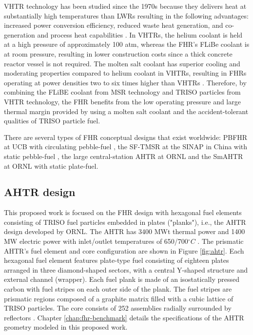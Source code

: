 \gls{VHTR} technology has been studied since the 1970s because they delivers 
heat at substantially high temperatures than \glspl{LWR} resulting in 
the following advantages: increased power conversion efficiency, reduced 
waste heat generation, and co-generation and process heat capabilities 
\cite{scarlat_design_2014}. 
In \glspl{VHTR}, the helium coolant is held at a high pressure of approximately 
100 atm, whereas the \gls{FHR}'s FLiBe coolant is at room pressure, resulting in lower 
construction costs since a thick concrete reactor vessel is not required.
The molten salt coolant has superior cooling and moderating properties compared 
to helium coolant in \glspl{VHTR}, resulting in \glspl{FHR} operating at 
power densities two to six times higher than  \glspl{VHTR} 
\cite{scarlat_design_2014,forsberg_fluoride-salt-cooled_2012}.
Therefore, by combining the FLiBE coolant from \gls{MSR} technology and 
\gls{TRISO} particles from \gls{VHTR} technology, the \gls{FHR} benefits from 
the low operating pressure and large thermal margin provided by using a molten 
salt coolant and the accident-tolerant qualities of \gls{TRISO} particle fuel. 

There are several types of \gls{FHR} conceptual designs that exist
worldwide: \gls{PBFHR} at UCB with circulating pebble-fuel 
\cite{scarlat_current_2014,krumwiede_three-dimensional_2013}, the \gls{SF-TMSR} 
at the \gls{SINAP} in China with static pebble-fuel \cite{liu_preliminary_2016}, 
the large central-station \gls{AHTR} at \gls{ORNL} \cite{holcomb_core_2011, varma_ahtr_2012} and 
the \gls{SmAHTR} at ORNL \cite{greene_pre-conceptual_2010} with static plate-fuel. 

\subsection{AHTR design}
This proposed work is focused on the FHR design with hexagonal fuel elements 
consisting of \gls{TRISO} fuel particles embedded in plates ("planks"), i.e., the 
\gls{AHTR} design developed by ORNL. 
The \gls{AHTR} has 3400 MWt thermal power and 1400 MW electric power with
inlet/outlet temperatures of 650/700$^{\circ}C$ \cite{varma_ahtr_2012}. 
The prismatic \gls{AHTR}'s fuel element and core configuration are shown in 
Figure \ref{fig:ahtr}.  
Each hexagonal fuel element features plate-type fuel consisting of eighteen plates 
arranged in three diamond-shaped sectors, with a central Y-shaped structure 
and external channel (wrapper).
Each fuel plank is made of an isostatically pressed carbon with fuel stripes 
on each outer side of the plank. 
The fuel stripes are prismatic regions composed of a graphite matrix filled with 
a cubic lattice of \gls{TRISO} particles. 
The core consists of 252 assemblies radially surrounded by reflectors
\cite{ramey_monte_2018}. 
Chapter \ref{chap:fhr-benchmark} details the specifications of the AHTR geometry
modeled in this proposed work.

